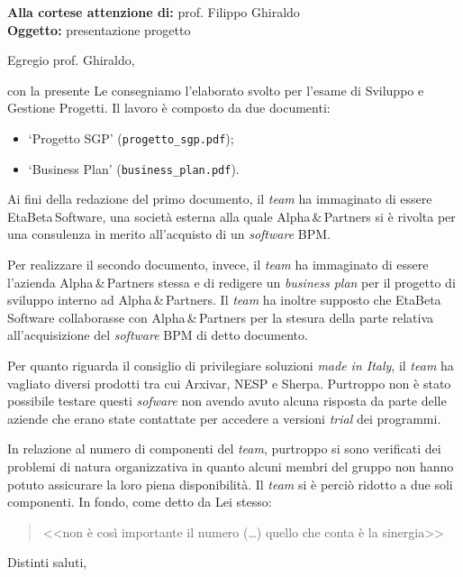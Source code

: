 \documentclass[a4paper,11pt]{letter}
\date{Padova, 19 luglio 2013}
\newcommand{\giraldo}{Ghiraldo\xspace}
\newcommand{\inglese}[1]{\foreignlanguage{english}{\textit{#1}}}
\newcommand{\team}{\textsf{EtaBeta\,Software}\xspace}
\newcommand{\customer}{\textsf{Alpha\,\&\,Partners}\xspace}
\begin{document}
\begin{letter}{
  \textbf{Alla cortese attenzione di:} prof. Filippo \giraldo\\
  \textbf{Oggetto:} presentazione progetto}

\opening{Egregio prof. \giraldo,}

con la presente Le consegniamo l'elaborato svolto per l'esame di Sviluppo e Gestione Progetti. Il lavoro è composto da due documenti:
\begin{itemize}
\renewcommand{\labelitemi}{--}
  \item `Progetto SGP' (\texttt{progetto\_sgp.pdf});
  \item `Business Plan' (\texttt{business\_plan.pdf}).
\end{itemize}

Ai fini della redazione del primo documento, il \inglese{team} ha immaginato di essere \team, una società esterna alla quale \customer si è rivolta per una consulenza in merito all'acquisto di un \inglese{software} BPM.

Per realizzare il secondo documento, invece, il \inglese{team} ha immaginato di essere l'azienda \customer stessa e di redigere un \inglese{business plan} per il progetto di sviluppo interno ad \customer. Il \inglese{team} ha inoltre supposto che \team collaborasse con \customer per la stesura della parte relativa all'acquisizione del \inglese{software} BPM di detto documento.

Per quanto riguarda il consiglio di privilegiare soluzioni \inglese{made in Italy}, il \inglese{team} ha vagliato diversi prodotti tra cui \textsf{Arxivar}, \textsf{NESP} e \textsf{Sherpa}. Purtroppo non è stato possibile testare questi \inglese{sofware} non avendo avuto alcuna risposta da parte delle aziende che erano state contattate per accedere a versioni \inglese{trial} dei programmi.

In relazione al numero di componenti del \inglese{team}, purtroppo si sono verificati dei problemi di natura organizzativa in quanto alcuni membri del gruppo non hanno potuto assicurare la loro piena disponibilità. Il \inglese{team} si è perciò ridotto a due soli componenti. In fondo, come detto da Lei stesso:
\begin{quotation}\footnotesize
  <<non è così importante il numero (\dots) quello che conta è la sinergia>>
\end{quotation}

\closing{Distinti saluti,}


\end{letter}
\end{document}
